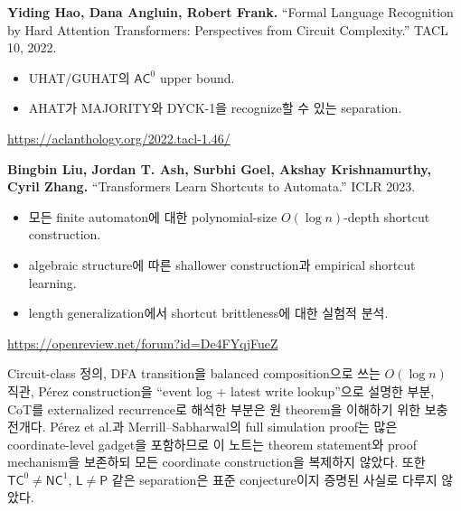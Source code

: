 \documentclass[11pt,a4paper,oneside,openany]{memoir}
\theoremstyle{definition}
\newcommand{\AC}{\mathsf{AC}}
\newcommand{\TC}{\mathsf{TC}}
\newcommand{\NC}{\mathsf{NC}}
\newcommand{\Lclass}{\mathsf{L}}
\newcommand{\Pclass}{\mathsf{P}}
\begin{document}
\vspace{0.8em}
\textbf{Yiding Hao, Dana Angluin, Robert Frank.}
``Formal Language Recognition by Hard Attention Transformers: Perspectives from Circuit Complexity.'' TACL 10, 2022.

\begin{itemize}
  \item UHAT/GUHAT의 $\AC^0$ upper bound.
  \item AHAT가 MAJORITY와 DYCK-1을 recognize할 수 있는 separation.
\end{itemize}
\url{https://aclanthology.org/2022.tacl-1.46/}

\vspace{0.8em}
\textbf{Bingbin Liu, Jordan T. Ash, Surbhi Goel, Akshay Krishnamurthy, Cyril Zhang.}
``Transformers Learn Shortcuts to Automata.'' ICLR 2023.

\begin{itemize}
  \item 모든 finite automaton에 대한 polynomial-size $O(\log n)$-depth shortcut construction.
  \item algebraic structure에 따른 shallower construction과 empirical shortcut learning.
  \item length generalization에서 shortcut brittleness에 대한 실험적 분석.
\end{itemize}
\url{https://openreview.net/forum?id=De4FYqjFueZ}

\begin{warningbox}
Circuit-class 정의, DFA transition을 balanced composition으로 쓰는 $O(\log n)$ 직관, Pérez construction을 ``event log + latest write lookup''으로 설명한 부분, CoT를 externalized recurrence로 해석한 부분은 원 theorem을 이해하기 위한 보충 전개다. Pérez et al.과 Merrill--Sabharwal의 full simulation proof는 많은 coordinate-level gadget을 포함하므로 이 노트는 theorem statement와 proof mechanism을 보존하되 모든 coordinate construction을 복제하지 않았다. 또한 $\TC^0\neq\NC^1$, $\Lclass\neq\Pclass$ 같은 separation은 표준 conjecture이지 증명된 사실로 다루지 않았다.
\end{warningbox}
\end{document}
